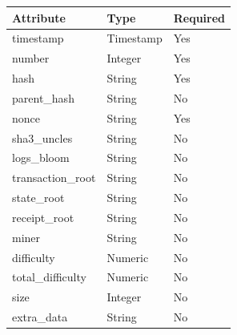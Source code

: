\begin{table}[H]
\centering
    \begin{tabular}  { m{6cm} m{3cm} m{3cm} } 
    \toprule
    \textbf{Attribute} & \textbf{Type} & \textbf{Required} \\
    \midrule
    timestamp & Timestamp & Yes\\ %
    number & Integer & Yes\\ %
    hash & String & Yes\\ %
    parent\_hash & String & No\\ %
    nonce & String & Yes\\ %
    sha3\_uncles & String & No\\ %
    logs\_bloom & String & No\\ %
    transaction\_root & String & No\\ %
    state\_root& String & No\\ %
    receipt\_root & String & No\\ %
    miner & String & No\\ %
    difficulty & Numeric & No\\ %
    total\_difficulty & Numeric & No\\ %
    size & Integer & No\\ %
    extra\_data & String & No\\ %

\end{tabular}
\end{table}
